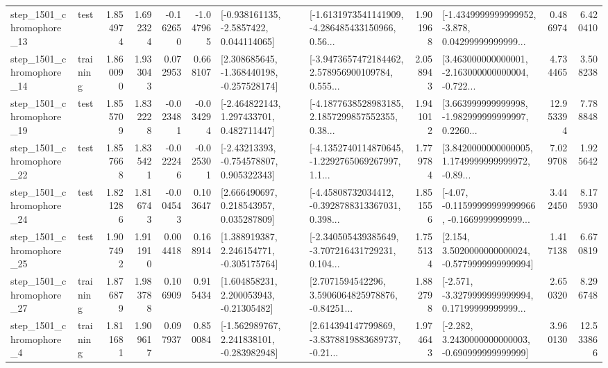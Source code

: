\begin{tabular}{llrrrrllrlrr}
 step\_1501\_chromophore\_13 &      test &      1.854974 &    1.692324 &     -0.162650 & -1.047965 &     [-0.938161135, -2.5857422, 0.044114065] &  [-1.6131973541141909, -4.286485433150966, 0.56... &       1.901968 &  [-1.4349999999999952, -3.878, 0.04299999999999... &            0.486974 &          6.420410 \\
 step\_1501\_chromophore\_14 &  training &      1.860090 &    1.933043 &      0.072953 &  0.668107 &   [2.308685645, -1.368440198, -0.257528174] &  [-3.9473657472184462, 2.578956900109784, 0.555... &       2.058943 &  [3.463000000000001, -2.163000000000004, -0.722... &            4.734465 &          3.508238 \\
 step\_1501\_chromophore\_19 &      test &      1.855709 &    1.832228 &     -0.023481 & -0.034294 &    [-2.464822143, 1.297433701, 0.482711447] &  [-4.1877638528983185, 2.1857299857552355, 0.38... &       1.941012 &  [3.663999999999998, -1.982999999999997, 0.2260... &           12.953394 &          7.788848 \\
 step\_1501\_chromophore\_22 &      test &      1.857668 &    1.835421 &     -0.022246 & -0.025301 &    [-2.43213393, -0.754578807, 0.905322343] &  [-4.1352740114870645, -1.2292765069267997, 1.1... &       1.779784 &  [3.8420000000000005, 1.1749999999999972, -0.89... &            7.029708 &          1.925642 \\
 step\_1501\_chromophore\_24 &      test &      1.821286 &    1.816743 &     -0.004543 &  0.103647 &     [2.666490697, 0.218543957, 0.035287809] &  [-4.45808732034412, -0.3928788313367031, 0.398... &       1.851556 &  [-4.07, -0.11599999999999966, -0.1669999999999... &            3.442450 &          8.175930 \\
 step\_1501\_chromophore\_25 &      test &      1.907492 &    1.911910 &      0.004418 &  0.168914 &    [1.388919387, 2.246154771, -0.305175764] &  [-2.340505439385649, -3.707216431729231, 0.104... &       1.755134 &   [2.154, 3.5020000000000024, -0.5779999999999994] &            1.417138 &          6.670819 \\
 step\_1501\_chromophore\_27 &  training &      1.876879 &    1.983788 &      0.106909 &  0.915434 &     [1.604858231, 2.200053943, -0.21305482] &  [2.7071594542296, 3.5906064825978876, -0.84251... &       1.882798 &  [-2.571, -3.3279999999999994, 0.17199999999999... &            2.650320 &          8.296748 \\
  step\_1501\_chromophore\_4 &  training &      1.811681 &    1.909617 &      0.097937 &  0.850084 &   [-1.562989767, 2.241838101, -0.283982948] &  [2.614394147799869, -3.8378819883689737, -0.21... &       1.974643 &   [-2.282, 3.2430000000000003, -0.690999999999999] &            3.960130 &         12.533866 \\

\end{tabular}
